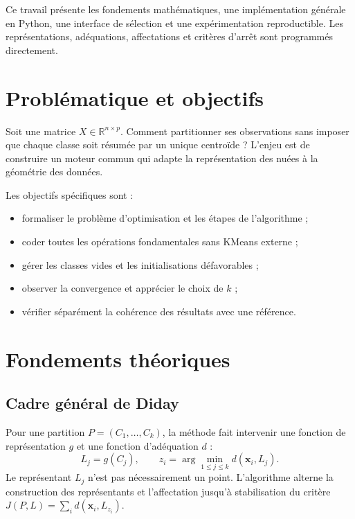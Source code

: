 \documentclass[12pt,a4paper]{article}
\begin{document}
Ce travail présente les fondements mathématiques, une implémentation générale
en Python, une interface de sélection et une expérimentation reproductible. Les
représentations, adéquations, affectations et critères d'arrêt sont programmés
directement.

\section{Problématique et objectifs}
Soit une matrice $X\in\mathbb{R}^{n\times p}$. Comment partitionner ses
observations sans imposer que chaque classe soit résumée par un unique
centroïde ? L'enjeu est de construire un moteur commun qui adapte la
représentation des nuées à la géométrie des données.

Les objectifs spécifiques sont :
\begin{itemize}[itemsep=2pt]
  \item formaliser le problème d'optimisation et les étapes de l'algorithme ;
  \item coder toutes les opérations fondamentales sans KMeans externe ;
  \item gérer les classes vides et les initialisations défavorables ;
  \item observer la convergence et apprécier le choix de $k$ ;
  \item vérifier séparément la cohérence des résultats avec une référence.
\end{itemize}

\section{Fondements théoriques}
\subsection{Cadre général de Diday}
Pour une partition $P=(C_1,\ldots,C_k)$, la méthode fait intervenir une
fonction de représentation $g$ et une fonction d'adéquation $d$ :
\[
 L_j=g(C_j), \qquad z_i=\arg\min_{1\leq j\leq k}d(\mathbf{x}_i,L_j).
\]
Le représentant $L_j$ n'est pas nécessairement un point. L'algorithme alterne
la construction des représentants et l'affectation jusqu'à stabilisation du
critère $J(P,L)=\sum_i d(\mathbf{x}_i,L_{z_i})$.
\end{document}
